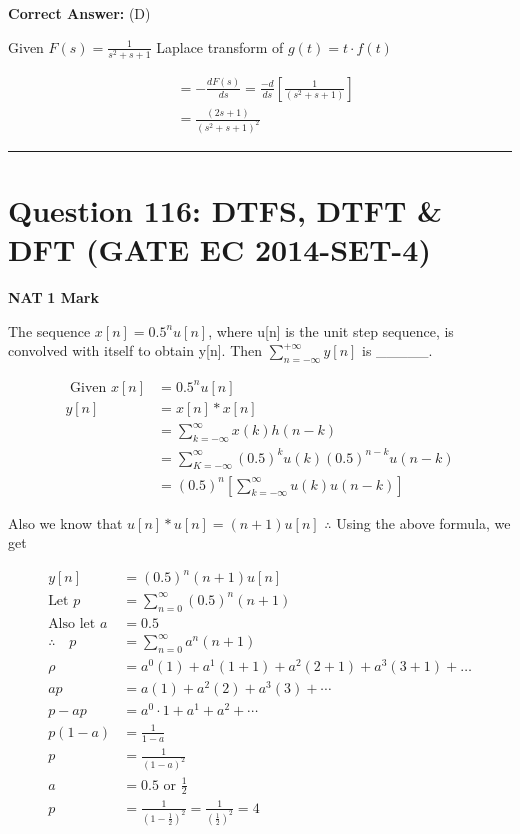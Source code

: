 \documentclass[11pt,a4paper]{article}
\begin{document}
\noindent \textbf{Correct Answer:} (D)

\begin{tcolorbox}[solbox, title=Detailed Solution -- Question 115]
Given $F(s)=\frac{1}{s^{2}+s+1}$
 Laplace transform of $g(t)=t \cdot f(t)$

\[
\begin{aligned} &=-\frac{d F(s)}{d s}=\frac{-d}{d s}\left[\frac{1}{\left(s^{2}+s+1\right)}\right] \\ &=\frac{(2 s+1)}{\left(s^{2}+s+1\right)^{2}} \end{aligned}
\]
\end{tcolorbox}

\vspace{1.5em}
\hrule
\vspace{1.5em}

\section*{Question 116: DTFS, DTFT \& DFT (GATE EC 2014-SET-4)}
\noindent \textbf{\color{primary}NAT} \hfill \textbf{\color{secondary}1 Mark}


\noindent The sequence $x[n]=0.5^{n}u[n]$, where u[n] is the unit step sequence, is convolved with itself to obtain y[n]. Then $\sum_{n=-\infty }^{+\infty }y[n]$ is \_\_\_\_\_.


\begin{tcolorbox}[solbox, title=Detailed Solution -- Question 116]
\[
\begin{aligned} \text { Given } x[n] &=0.5^{n} u[n] \\ y[n] &=x[n] * x[n] \\ &=\sum_{k=-\infty}^{\infty} x(k) h(n-k)\\ &=\sum_{K=-\infty}^{\infty}(0.5)^{k} u(k)(0.5)^{n-k} u(n-k) \\ &=(0.5)^{n}\left[\sum_{k=-\infty}^{\infty} u(k) u(n-k)\right] \end{aligned}
\]

 Also we know that $u[n] * u[n]=(n+1) u[n]$
$\therefore$ Using the above formula, we get 

\[
\begin{aligned} y[n]&=(0.5)^{n}(n+1) u[n] \\ \text{Let }p&=\sum_{n=0}^{\infty}(0.5)^{n}(n+1) \\ \text{Also let }a&=0.5 \\ \therefore \quad p&=\sum_{n=0}^{\infty} a^{n}(n+1) \\ \rho&=a^{0}(1)+a^{1}(1+1)+a^{2}(2+1)+a^{3}(3+1)+\ldots \\ a p&=a(1)+a^{2}(2)+a^{3}(3)+\cdots \\ p-a p&=a^{0} \cdot 1+a^{1}+a^{2}+\cdots \\ p(1-a)&=\frac{1}{1-a} \\ p&=\frac{1}{(1-a)^{2}} \\ a&=0.5 \text{ or } \frac{1}{2} \\ p&=\frac{1}{\left(1-\frac{1}{2}\right)^{2}}=\frac{1}{\left(\frac{1}{2}\right)^{2}}=4 \end{aligned}
\]
\end{tcolorbox}
\end{document}
